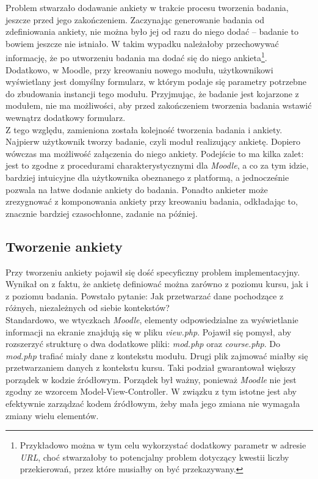 Problem stwarzało dodawanie ankiety w trakcie procesu tworzenia badania, jeszcze przed jego zakończeniem. Zaczynając generowanie badania od zdefiniowania ankiety, nie można było jej od razu do niego dodać -- badanie to bowiem jeszcze nie istniało. W takim wypadku należałoby przechowywać informację, że po utworzeniu badania ma dodać się do niego ankieta\footnote{Przykładowo można w tym celu wykorzystać dodatkowy parametr w adresie \textit{URL}, choć stwarzałoby to potencjalny problem dotyczący kwestii liczby przekierowań, przez które musiałby on być przekazywany.}. Dodatkowo, w Moodle, przy kreowaniu nowego modułu, użytkownikowi wyświetlany jest domyślny formularz, w którym podaje się parametry potrzebne do zbudowania instancji tego modułu. Przyjmując, że badanie jest kojarzone z modułem, nie ma możliwości, aby przed zakończeniem tworzenia badania wstawić wewnątrz dodatkowy formularz. \\

Z tego względu, zamieniona została kolejność tworzenia badania i ankiety. Najpierw użytkownik tworzy badanie, czyli moduł realizujący ankietę. Dopiero wówczas ma możliwość załączenia do niego ankiety. Podejście to ma kilka zalet: jest to zgodne z procedurami charakterystycznymi dla \textit{Moodle}, a co za tym idzie, bardziej intuicyjne dla użytkownika obeznanego z platformą, a jednocześnie pozwala na łatwe dodanie ankiety do badania. Ponadto ankieter może zrezygnować z komponowania ankiety przy kreowaniu badania, odkładając to, znacznie bardziej czasochłonne, zadanie na później.

\subsection{Tworzenie ankiety}
\label{Chapter629}

Przy tworzeniu ankiety pojawił się dość specyficzny problem implementacyjny. Wynikał on z faktu, że ankietę definiować można zarówno z poziomu kursu, jak i z poziomu badania. Powstało pytanie: Jak przetwarzać dane pochodzące z różnych, niezależnych od siebie kontekstów? \\

Standardowo, we wtyczkach \textit{Moodle}, elementy odpowiedzialne za wyświetlanie informacji na ekranie znajdują się w pliku \textit{view.php}. Pojawił się pomysł, aby rozszerzyć strukturę o dwa dodatkowe pliki: \textit{mod.php} oraz \textit{course.php}. Do \textit{mod.php} trafiać miały dane z kontekstu modułu. Drugi plik zajmować miałby się przetwarzaniem danych z kontekstu kursu. Taki podział gwarantował większy porządek w kodzie źródłowym. Porządek był ważny, ponieważ \textit{Moodle} nie jest zgodny ze wzorcem Model-View-Controller. W związku z tym istotne jest aby efektywnie zarządzać kodem źródłowym, żeby mała jego zmiana nie wymagała zmiany wielu elementów. \\

